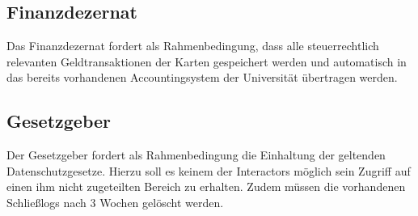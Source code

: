         \subsection*{Finanzdezernat}
            Das Finanzdezernat fordert als Rahmenbedingung, dass alle steuerrechtlich relevanten Geldtransaktionen der Karten gespeichert werden und automatisch in das bereits vorhandenen Accountingsystem der Universität übertragen werden. 
        \subsection*{Gesetzgeber}  
            Der Gesetzgeber fordert als Rahmenbedingung die Einhaltung der geltenden Datenschutzgesetze. Hierzu soll es keinem der Interactors möglich sein Zugriff auf einen ihm nicht zugeteilten Bereich zu erhalten. Zudem müssen die vorhandenen Schließlogs nach 3 Wochen gelöscht werden. 
